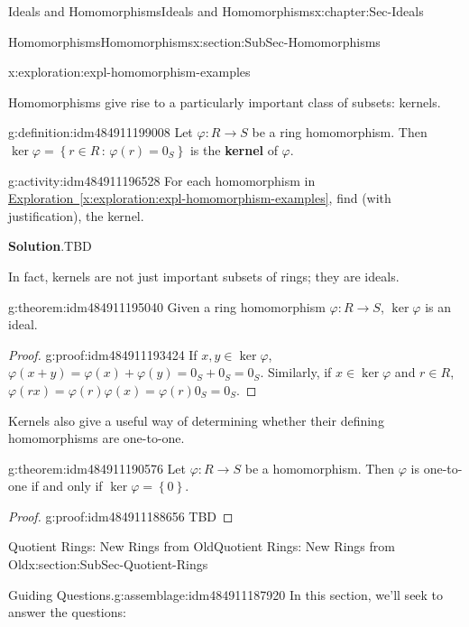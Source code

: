 \documentclass[oneside,10pt,]{book}
\newcommand{\blocktitlefont}{\relax}
\newcommand{\xreffont}{\relax}
\newcommand{\terminology}[1]{\textbf{#1}}
\numberwithin{equation}{section}
\def\p{\varphi}
\newcommand{\set}[1]{\left\{ {#1} \right\}}
\newcommand{\setof}[2]{{\left\{#1\,\colon\,#2\right\}}}
\begin{document}
\begin{chapterptx}{Ideals and Homomorphisms}{}{Ideals and Homomorphisms}{}{}{x:chapter:Sec-Ideals}
\begin{sectionptx}{Homomorphisms}{}{Homomorphisms}{}{}{x:section:SubSec-Homomorphisms}
\begin{exploration}{}{x:exploration:expl-homomorphism-examples}
\end{exploration}
Homomorphisms give rise to a particularly important class of subsets: kernels.%
\begin{definition}{}{g:definition:idm484911199008}%
Let \(\p : R \to S\) be a ring homomorphism. Then \(\ker \p =\setof{r\in R}{\p(r)=0_S}\) is the \terminology{kernel} of \(\p\).%
\end{definition}
\begin{activity}{}{g:activity:idm484911196528}%
For each homomorphism in \hyperref[x:exploration:expl-homomorphism-examples]{Exploration~{\xreffont\ref{x:exploration:expl-homomorphism-examples}}}, find (with justification), the kernel.%
\par\smallskip%
\noindent\textbf{\blocktitlefont Solution}.\hypertarget{g:solution:idm484911195424}{}\quad{}TBD\end{activity}
In fact, kernels are not just important subsets of rings; they are ideals.%
\begin{theorem}{}{}{g:theorem:idm484911195040}%
Given a ring homomorphism \(\p : R\to S\), \(\ker\p\) is an ideal.%
\end{theorem}
\begin{proof}{}{g:proof:idm484911193424}
If \(x,y\in \ker\p\), \(\p(x+y) = \p(x) + \p(y) = 0_S + 0_S = 0_S\). Similarly, if \(x\in \ker \p\) and \(r\in R\), \(\p(rx) = \p(r) \p(x) = \p(r) 0_S = 0_S\).%
\end{proof}
Kernels also give a useful way of determining whether their defining homomorphisms are one-to-one.%
\begin{theorem}{}{}{g:theorem:idm484911190576}%
Let \(\p : R\to S\) be a homomorphism. Then \(\p\) is one-to-one if and only if \(\ker\p = \set{0}\).%
\end{theorem}
\begin{proof}{}{g:proof:idm484911188656}
TBD\end{proof}
\end{sectionptx}
%
%
\typeout{************************************************}
\typeout{************************************************}
%
\begin{sectionptx}{Quotient Rings: New Rings from Old}{}{Quotient Rings: New Rings from Old}{}{}{x:section:SubSec-Quotient-Rings}
\begin{assemblage}{Guiding Questions.}{g:assemblage:idm484911187920}%
In this section, we'll seek to answer the questions: %
\begin{itemize}[label=\textbullet]

\end{itemize}
\end{assemblage}
\end{sectionptx}
\end{chapterptx}
\end{document}
